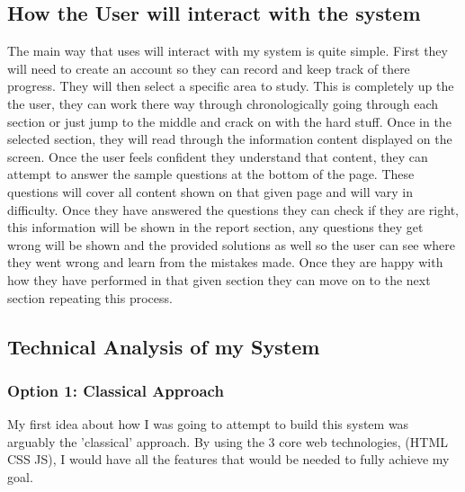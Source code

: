 \subsection{How the User will interact with the system}

The main way that uses will interact with my system is quite simple. First they will need to create an account so they can record and keep track of there progress. They will then select a specific area to study. This is completely up the the user, they can work there way through chronologically going through each section or just jump to the middle and crack on with the hard stuff. Once in the selected section, they will read through the information content displayed on the screen. Once the user feels confident they understand that content, they can attempt to answer the sample questions at the bottom of the page. These questions will cover all content shown on that given page and will vary in difficulty. Once they have answered the questions they can check if they are right, this information will be shown in the report section, any questions they get wrong will be shown and the provided solutions as well so the user can see where they went wrong and learn from the mistakes made. Once they are happy with how they have performed in that given section they can move on to the next section repeating this process.

\subsection{Technical Analysis of my System}
\subsubsection{Option 1: Classical Approach}

My first idea about how I was going to attempt to build this system was arguably the 'classical' approach. By using the 3 core web technologies, (HTML CSS JS), I would have all the features that would be needed to fully achieve my goal.

